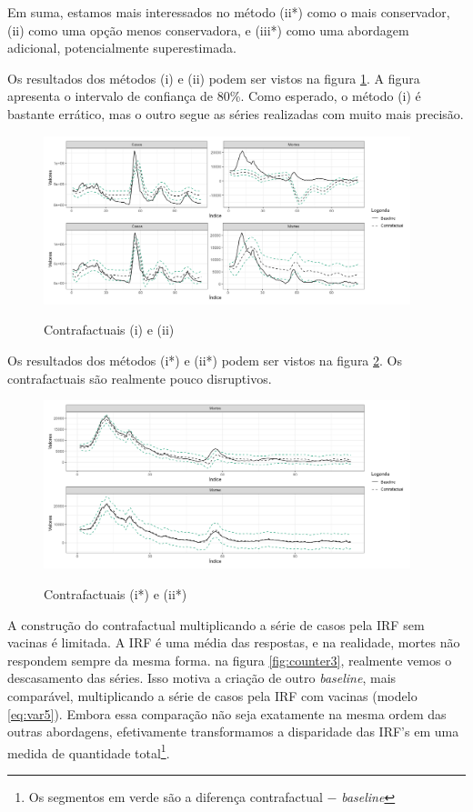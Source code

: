 \documentclass[
    article,
	12pt,				%
	oneside,			%
	a4paper,			%
	english,			%
	brazil,				%
	hyperref = {colorlinks, citecolor=c1d, linkcolor=c2d, urlcolor=c3d, colorlinks}
	]{abntex2}
\newcounter{j}
\begin{document}
Em suma, estamos mais interessados no método (ii*) como o mais conservador, (ii) como uma opção menos conservadora, e (iii*) como uma abordagem adicional, potencialmente superestimada.

Os resultados dos métodos (i) e (ii) podem ser vistos na figura \ref{fig:counter1}. A figura apresenta o intervalo de confiança de $80$\%. Como esperado, o método (i) é bastante errático, mas o outro segue as séries realizadas com muito mais precisão.

\begin{figure}[H]
    \centering
    \caption{Contrafactuais (i) e (ii)}
    \includegraphics[width = 0.95\textwidth]{Figures/res2_cf1-2.png}
    \label{fig:counter1}
\end{figure}

Os resultados dos métodos (i*) e (ii*) podem ser vistos na figura \ref{fig:counter2}. Os contrafactuais são realmente pouco disruptivos.

\begin{figure}[H]
    \centering
    \caption{Contrafactuais (i*) e (ii*)}
    \includegraphics[width = 0.95\textwidth]{Figures/res2_cf4-5.png}
    \label{fig:counter2}
\end{figure}

A construção do contrafactual multiplicando a série de casos pela IRF sem vacinas é limitada. A IRF é uma média das respostas, e na realidade, mortes não respondem sempre da mesma forma. na figura \ref{fig:counter3}, realmente vemos o descasamento das séries. Isso motiva a criação de outro \textit{baseline}, mais comparável, multiplicando a série de casos pela IRF com vacinas (modelo \eqref{eq:var5}). Embora essa comparação não seja exatamente na mesma ordem das outras abordagens, efetivamente transformamos a disparidade das IRF's em uma medida de quantidade total\footnote{Os segmentos em verde são a diferença contrafactual $-$ \textit{baseline}}.
\end{document}
